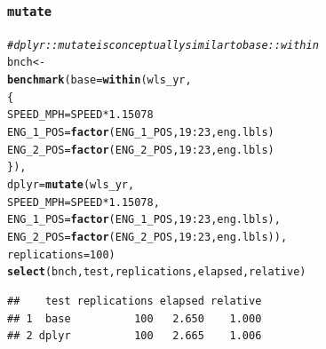 \documentclass{beamer}\usepackage[]{graphicx}\usepackage[]{color}
\makeatletter
\newcommand{\hlnum}[1]{\textcolor[rgb]{0.686,0.059,0.569}{#1}}%
\newcommand{\hlcom}[1]{\textcolor[rgb]{0.678,0.584,0.686}{\textit{#1}}}%
\newcommand{\hlopt}[1]{\textcolor[rgb]{0,0,0}{#1}}%
\newcommand{\hlstd}[1]{\textcolor[rgb]{0.345,0.345,0.345}{#1}}%
\newcommand{\hlkwb}[1]{\textcolor[rgb]{0.69,0.353,0.396}{#1}}%
\newcommand{\hlkwc}[1]{\textcolor[rgb]{0.333,0.667,0.333}{#1}}%
\newcommand{\hlkwd}[1]{\textcolor[rgb]{0.737,0.353,0.396}{\textbf{#1}}}%
\newenvironment{kframe}{%
 \def\at@end@of@kframe{}%
 \ifinner\ifhmode%
  \def\at@end@of@kframe{\end{minipage}}%
  \begin{minipage}{\columnwidth}%
 \fi\fi%
 \def\FrameCommand##1{\hskip\@totalleftmargin \hskip-\fboxsep
 \colorbox{shadecolor}{##1}\hskip-\fboxsep
     \hskip-\linewidth \hskip-\@totalleftmargin \hskip\columnwidth}%
 \MakeFramed {\advance\hsize-\width
   \@totalleftmargin\z@ \linewidth\hsize
   \@setminipage}}%
 {\par\unskip\endMakeFramed%
 \at@end@of@kframe}
\newenvironment{knitrout}{}{} %
\makeatother
\begin{document}
\begin{frame}[fragile]
  \frametitle{{\tt mutate}}
\begin{knitrout}\footnotesize
{}\color{fgcolor}\begin{kframe}
\begin{alltt}
\hlcom{# dplyr::mutate is conceptually similar to base::within}
\hlstd{bnch} \hlkwb{<-}
\hlkwd{benchmark}\hlstd{(}\hlkwc{base} \hlstd{=} \hlkwd{within}\hlstd{(wls_yr,}
                        \hlstd{\{}
                          \hlstd{SPEED_MPH} \hlkwb{=} \hlstd{SPEED} \hlopt{*} \hlnum{1.15078}
                          \hlstd{ENG_1_POS} \hlkwb{=} \hlkwd{factor}\hlstd{(ENG_1_POS,} \hlnum{19}\hlopt{:}\hlnum{23}\hlstd{, eng.lbls)}
                          \hlstd{ENG_2_POS} \hlkwb{=} \hlkwd{factor}\hlstd{(ENG_2_POS,} \hlnum{19}\hlopt{:}\hlnum{23}\hlstd{, eng.lbls)}
                        \hlstd{\}),}
          \hlkwc{dplyr} \hlstd{=} \hlkwd{mutate}\hlstd{(wls_yr,}
                         \hlkwc{SPEED_MPH} \hlstd{= SPEED} \hlopt{*} \hlnum{1.15078}\hlstd{,}
                         \hlkwc{ENG_1_POS} \hlstd{=} \hlkwd{factor}\hlstd{(ENG_1_POS,} \hlnum{19}\hlopt{:}\hlnum{23}\hlstd{, eng.lbls),}
                         \hlkwc{ENG_2_POS} \hlstd{=} \hlkwd{factor}\hlstd{(ENG_2_POS,} \hlnum{19}\hlopt{:}\hlnum{23}\hlstd{, eng.lbls)),}
          \hlkwc{replications} \hlstd{=} \hlnum{100}\hlstd{)}
\hlkwd{select}\hlstd{(bnch, test, replications, elapsed, relative)}
\end{alltt}
\begin{verbatim}
##    test replications elapsed relative
## 1  base          100   2.650    1.000
## 2 dplyr          100   2.665    1.006
\end{verbatim}
\end{kframe}
\end{knitrout}
\end{frame} 
\end{document}
